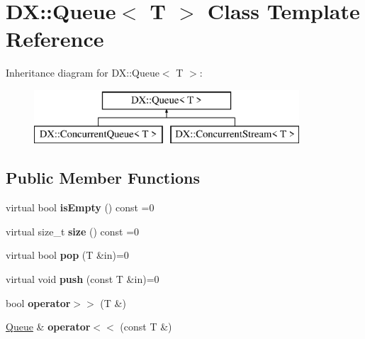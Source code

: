 \hypertarget{class_d_x_1_1_queue}{\section{D\-X\-:\-:Queue$<$ T $>$ Class Template Reference}
\label{class_d_x_1_1_queue}
}
Inheritance diagram for D\-X\-:\-:Queue$<$ T $>$\-:\begin{figure}[H]
\begin{center}
\leavevmode
\includegraphics[height=2.000000cm]{class_d_x_1_1_queue}
\end{center}
\end{figure}
\subsection*{Public Member Functions}
\begin{DoxyCompactItemize}
\item 
\hypertarget{class_d_x_1_1_queue_aa2fd26d8ba5b96c5ce70c0bd75f9cc4c}{virtual bool {\bfseries is\-Empty} () const =0}\label{class_d_x_1_1_queue_aa2fd26d8ba5b96c5ce70c0bd75f9cc4c}

\item 
\hypertarget{class_d_x_1_1_queue_a9e776e71a18d3593ce888877d3d92ac7}{virtual size\-\_\-t {\bfseries size} () const =0}\label{class_d_x_1_1_queue_a9e776e71a18d3593ce888877d3d92ac7}

\item 
\hypertarget{class_d_x_1_1_queue_a37d06d4d1c44ef1393230f0ab995e585}{virtual bool {\bfseries pop} (T \&in)=0}\label{class_d_x_1_1_queue_a37d06d4d1c44ef1393230f0ab995e585}

\item 
\hypertarget{class_d_x_1_1_queue_a1b2b163d92437074055e89837a9414f1}{virtual void {\bfseries push} (const T \&in)=0}\label{class_d_x_1_1_queue_a1b2b163d92437074055e89837a9414f1}

\item 
\hypertarget{class_d_x_1_1_queue_a96ed0255ea3237a9cf66dd7f6aa85a27}{bool {\bfseries operator$>$$>$} (T \&)}\label{class_d_x_1_1_queue_a96ed0255ea3237a9cf66dd7f6aa85a27}

\item 
\hypertarget{class_d_x_1_1_queue_a89202fcd64704521f67b506266d06ec8}{\hyperlink{class_d_x_1_1_queue}{Queue} \& {\bfseries operator$<$$<$} (const T \&)}\label{class_d_x_1_1_queue_a89202fcd64704521f67b506266d06ec8}

\end{DoxyCompactItemize}
